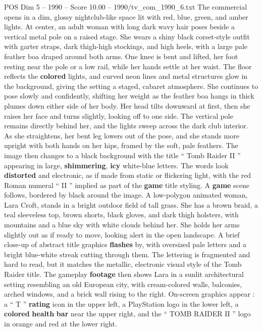 \begin{textsample}{POS Dim 5 – 1990 – Score 10.00 – 1990/tv\_com\_1990\_6.txt}  \label{ex:f5_pos_010}
The commercial opens in a dim, glossy nightclub-like space lit with red, blue, green, and amber lights.
At center, an adult woman with long dark wavy hair poses beside a vertical metal pole on a raised stage.
She wears a shiny black corset-style outfit with garter straps, dark thigh-high stockings, and high heels, with a large pale feather boa draped around both arms.
One knee is bent and lifted, her foot resting near the pole or a low rail, while her hands settle at her waist.
The floor reflects the \textbf{colored} lights, and curved neon lines and metal structures glow in the background, giving the setting a staged, cabaret atmosphere.
She continues to pose slowly and confidently, shifting her weight as the feather boa hangs in thick plumes down either side of her body.
Her head tilts downward at first, then she raises her face and turns slightly, looking off to one side.
The vertical pole remains directly behind her, and the lights sweep across the dark club interior.
As she straightens, her bent leg lowers out of the pose, and she stands more upright with both hands on her hips, framed by the soft, pale feathers.
The image then changes to a black background with the title “ Tomb Raider II ” appearing in large, \textbf{shimmering}, \textbf{icy} white-blue letters.
The words look \textbf{distorted} and electronic, as if made from static or flickering light, with the red Roman numeral “ II ” implied as part of the \textbf{game} title styling.
A \textbf{game} scene follows, bordered by black around the image.
A low-polygon animated woman, Lara Croft, stands in a bright outdoor field of tall grass.
She has a brown braid, a teal sleeveless top, brown shorts, black gloves, and dark thigh holsters, with mountains and a blue sky with white clouds behind her.
She holds her arms slightly out as if ready to move, looking alert in the open landscape.
A brief close-up of abstract title graphics \textbf{flashes} by, with oversized pale letters and a bright blue-white streak cutting through them.
The lettering is fragmented and hard to read, but it matches the metallic, electronic visual style of the Tomb Raider title.
The gameplay \textbf{footage} then shows Lara in a sunlit architectural setting resembling an old European city, with cream-colored walls, balconies, arched windows, and a brick wall rising to the right.
On-screen graphics appear : a “ T ” \textbf{rating} icon in the upper left, a PlayStation logo in the lower left, a \textbf{colored} \textbf{health} \textbf{bar} near the upper right, and the “ TOMB RAIDER II ” logo in orange and red at the lower right.

\end{textsample}
